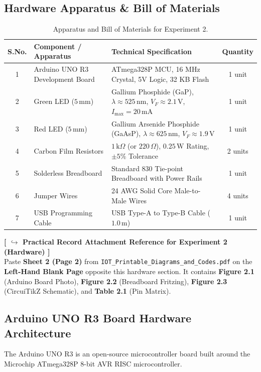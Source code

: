 \documentclass[11pt,a4paper]{article}
\begin{document}
\subsection{Hardware Apparatus \& Bill of Materials}
\begin{table}[H]
\centering
\footnotesize
\renewcommand{\arraystretch}{1.25}
\begin{tabularx}{\textwidth}{|c|l|X|c|}
\hline
\textbf{S.No.} & \textbf{Component / Apparatus} & \textbf{Technical Specification} & \textbf{Quantity} \\
\hline
1 & Arduino UNO R3 Development Board & ATmega328P MCU, 16 MHz Crystal, 5V Logic, 32 KB Flash & 1 unit \\
2 & Green LED ($5\,\text{mm}$) & Gallium Phosphide (GaP), $\lambda \approx 525\,\text{nm}$, $V_F \approx 2.1\,\text{V}$, $I_{\max} = 20\,\text{mA}$ & 1 unit \\
3 & Red LED ($5\,\text{mm}$) & Gallium Arsenide Phosphide (GaAsP), $\lambda \approx 625\,\text{nm}$, $V_F \approx 1.9\,\text{V}$ & 1 unit \\
4 & Carbon Film Resistors & $1\,\text{k}\Omega$ (or $220\,\Omega$), $0.25\,\text{W}$ Rating, $\pm 5\%$ Tolerance & 2 units \\
5 & Solderless Breadboard & Standard 830 Tie-point Breadboard with Power Rails & 1 unit \\
6 & Jumper Wires & 24 AWG Solid Core Male-to-Male Wires & 4 units \\
7 & USB Programming Cable & USB Type-A to Type-B Cable ($1.0\,\text{m}$) & 1 unit \\
\hline
\end{tabularx}
\caption{Apparatus and Bill of Materials for Experiment 2.}
\label{tab:exp2_bom}
\end{table}

\begin{attachmentbox}
\footnotesize
\textbf{[ $\hookrightarrow$ Practical Record Attachment Reference for Experiment 2 (Hardware) ]}\\
Paste \textbf{Sheet 2 (Page 2)} from \texttt{IOT\_Printable\_Diagrams\_and\_Codes.pdf} on the \textbf{Left-Hand Blank Page} opposite this hardware section. It contains \textbf{Figure 2.1} (Arduino Board Photo), \textbf{Figure 2.2} (Breadboard Fritzing), \textbf{Figure 2.3} (CircuiTikZ Schematic), and \textbf{Table 2.1} (Pin Matrix).
\end{attachmentbox}

\subsection{Arduino UNO R3 Board Hardware Architecture}
The Arduino UNO R3 is an open-source microcontroller board built around the Microchip ATmega328P 8-bit AVR RISC microcontroller.
\end{document}
